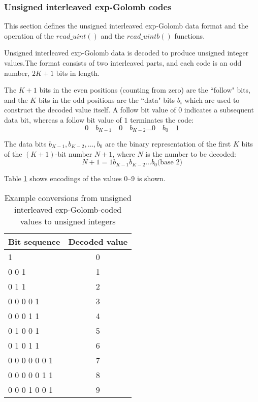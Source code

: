 \subsubsection{Unsigned interleaved exp-Golomb codes}
This section defines the unsigned interleaved exp-Golomb data format and the operation
of the $read\_uint()$ and the $read\_uintb()$ functions. 

Unsigned interleaved exp-Golomb data is decoded to produce unsigned
 integer values.The format consists of two interleaved parts, 
and each code is an odd number, $2K+1$ bits in length.

The $K+1$ bits in the even positions (counting from zero) are the ``follow" bits, and 
the $K$ bits in the odd positions are the ``data" bits $b_i$ which are used to construct
the decoded value itself. A follow bit value of $0$ indicates a subsequent data bit,
whereas a follow bit value of $1$ terminates the code:
\begin{equation*}
0\quad b_{K-1}\quad 0\quad b_{K-2}\hdots 0\quad b_{0}\quad 1
\end{equation*}

The data bits $b_{K-1}, b_{K-2}, \hdots, b_0$ are the binary representation 
 of the first $K$ bits of the $(K+1)$-bit number 
$N+1$, where $N$ is the number to be decoded:
\begin{equation*}
N+1=1 b_{K-1} b_{K-2}\hdots b_0 \text{(base $2$)}
\end{equation*}

Table \ref{table:uegolcodings} shows encodings of the values 0--9 is shown.

\begin{table}[!ht]
\centering
\begin{tabular}{|l|c|}
\hline
\rowcolor[gray]{0.75}Bit sequence & Decoded value \\
\hline
1                 &  0\\
0 0 1             &  1\\
0 1 1             &  2\\
0 0 0 0 1         &  3\\
0 0 0 1 1         &  4\\
0 1 0 0 1         &  5\\
0 1 0 1 1         &  6\\
0 0 0 0 0 0 1     &  7\\
0 0 0 0 0 1 1     &  8\\
0 0 0 1 0 0 1     &  9\\
\hline
\end{tabular}

\caption{Example conversions from unsigned interleaved exp-Golomb-coded 
values to unsigned integers \label{table:uegolcodings}}
\end{table}

